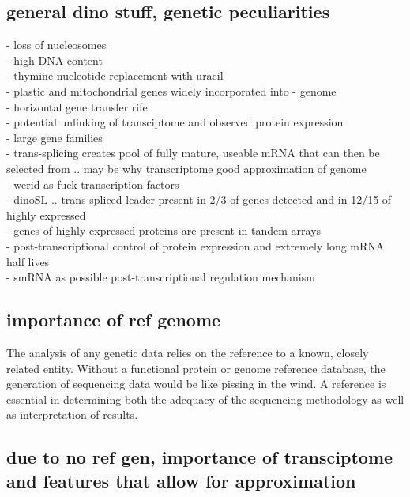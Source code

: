\documentclass[12pt]{article}
\begin{document}
\subsection*{general dino stuff, genetic peculiarities}
 - loss of nucleosomes \cite{rizzo1972chromosomal}\\
- high DNA content \cite{lajeunesse2005symbiodinium}\\
- thymine nucleotide replacement with uracil \cite{rae1976hydroxymethyluracil}\\
- plastic and mitochondrial genes widely incorporated into - genome \cite{bachvaroff2004dinoflagellate}\\
- horizontal gene transfer rife\\
- potential unlinking of transciptome and observed protein expression \cite{bachvaroff2008stop}\\
- large gene families \\
- trans-splicing creates pool of fully mature, useable mRNA that can then be selected from .. may be why transcriptome good approximation of genome \cite{lidie2007spliced,zhang2007spliced}\\
- werid as fuck transcription factors \cite{guillebault2002new}\\
- dinoSL .. trans-spliced leader present in 2/3 of genes detected and in 12/15 of highly expressed \cite{bachvaroff2008stop,lidie2007spliced}\\
- genes of highly expressed proteins are present in tandem arrays \cite{bachvaroff2008stop}\\
- post-transcriptional control of protein expression and extremely long mRNA half lives \cite{morey2013global}\\
- smRNA as possible post-transcriptional regulation mechanism \cite{baumgarten2013integrating}

\subsection*{importance of ref genome}
The analysis of any genetic data relies on the reference to a known, closely related entity. 
Without a functional protein or genome reference database, the generation of sequencing data would be like pissing in the wind. 
A reference is essential in determining both the adequacy of the sequencing methodology as well as interpretation of results. 
           

\subsection*{due to no ref gen, importance of transciptome and features that allow for approximation}
\end{document}
